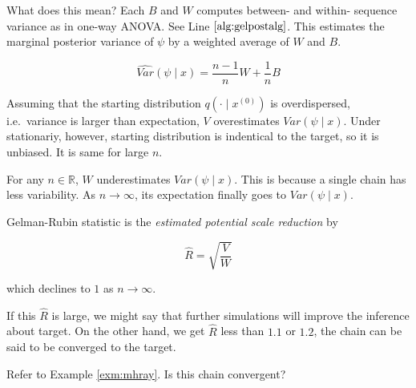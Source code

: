 \documentclass[]{book}
\theoremstyle{definition}
\theoremstyle{definition}
\theoremstyle{definition}
\theoremstyle{remark}
\let\BeginKnitrBlock\begin \let\EndKnitrBlock\end
\begin{document}
What does this mean? Each \(B\) and \(W\) computes between- and within- sequence variance as in one-way ANOVA. See Line \(\ref{alg:gelpostalg}\). This estimates the marginal posterior variance of \(\psi\) by a weighted average of \(W\) and \(B\).

\begin{equation}
  \widehat{Var}(\psi \mid x) = \frac{n - 1}{n} W + \frac{1}{n} B
  \label{eq:gelmarg}
\end{equation}

Assuming that the starting distribution \(q(\cdot \mid x^{(0)})\) is overdispersed, i.e.~variance is larger than expectation, \(V\) overestimates \(Var(\psi \mid x)\). Under stationariy, however, starting distribution is indentical to the target, so it is unbiased. It is same for large \(n\).

For any \(n \in \mathbb{R}\), \(W\) underestimates \(Var(\psi \mid x)\). This is because a single chain has less variability. As \(n \rightarrow \infty\), its expectation finally goes to \(Var(\psi \mid x)\).

\BeginKnitrBlock{definition}[Gelman-Rubin statistic]
\protect\hypertarget{def:gelstat}{}{\label{def:gelstat} {} }Gelman-Rubin statistic is the \textit{estimated potential scale reduction} by

\[\hat{R} = \sqrt{\frac{V}{W}}\]

which declines to \(1\) as \(n \rightarrow \infty\).
\EndKnitrBlock{definition}

If this \(\hat{R}\) is large, we might say that further simulations will improve the inference about target. On the other hand, we get \(\hat{R}\) less than \(1.1\) or \(1.2\), the chain can be said to be converged to the target.

Refer to Example \ref{exm:mhray}. Is this chain convergent?


\end{document}
